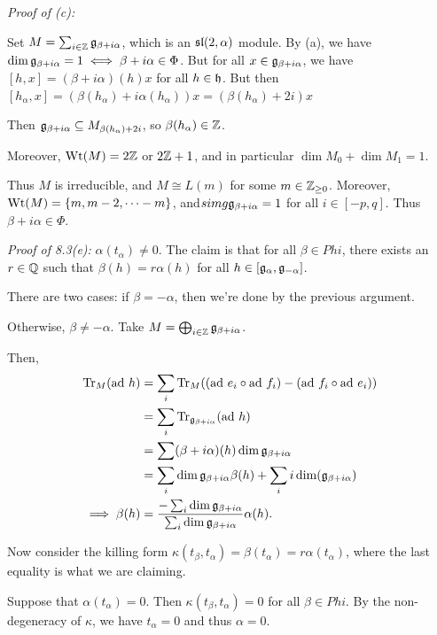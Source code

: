 \emph{Proof of (c):}

Set \(M = \sum_{i\in {\mathbb{Z}}} {\mathfrak{g}}_{\beta + i\alpha}\), which is an
\({\mathfrak{sl}}(2, \alpha)\) module. By (a), we have
\(\dim {\mathfrak{g}}_{\beta + i\alpha} = 1 \iff \beta + i\alpha \in \Phi\). But
for all \(x\in {\mathfrak{g}}_{\beta + i\alpha}\), we have
\([h, x] = (\beta + i\alpha)(h)x\) for all \(h\in{\mathfrak{h}}\). But then
\([h_\alpha, x] = (\beta(h_\alpha) + i \alpha(h_\alpha))x = (\beta(h_\alpha) + 2i)x\)

Then \({\mathfrak{g}}_{\beta + i\alpha} \subseteq M_{\beta(h_\alpha) + 2i}\), so
\(\beta(h_\alpha) \in {\mathbb{Z}}\).

Moreover, \(\mathrm{Wt}(M) = 2{\mathbb{Z}}\) or \(2{\mathbb{Z}} + 1\), and in particular
\(\dim M_0 + \dim M_1 = 1\).

Thus \(M\) is irreducible, and \(M \cong L(m)\) for some
\(m \in {\mathbb{Z}}_{\geq 0}\). Moreover,
\(\mathrm{Wt}(M) = \left\{{m, m-2, \cdots -m}\right\}\),
and\(simg {\mathfrak{g}}_{\beta + i\alpha} = 1\) for all \(i \in [-p, q]\). Thus
\(\beta + i\alpha \in \Phi\).

\emph{Proof of 8.3(e):} \(\alpha(t_\alpha) \neq 0\). The claim is that
for all \(\beta \in Phi\), there exists an \(r\in {\mathbb{Q}}\) such that
\(\beta(h) = r\alpha(h)\) for all
\(h \in [{\mathfrak{g}}_\alpha, {\mathfrak{g}}_{-\alpha}]\).

There are two cases: if \(\beta = -\alpha\), then we're done by the
previous argument.

Otherwise, \(\beta \neq -\alpha\). Take
\(M = \bigoplus_{i \in{\mathbb{Z}}} {\mathfrak{g}}_{\beta + i\alpha}\).

Then, \begin{align*}
\mathrm{Tr}_M(\mathrm{ad}~ h) 
&= \sum_i \mathrm{Tr}_M( (\mathrm{ad}~ e_i \circ \mathrm{ad}~ f_i) -(\mathrm{ad}~ f_i \circ \mathrm{ad}~ e_i) ) \\
&= \sum_i \mathrm{Tr}_{{\mathfrak{g}}_{\beta + i\alpha}}(\mathrm{ad}~ h) \\
&= \sum (\beta + i\alpha)(h) \dim {\mathfrak{g}}_{\beta + i\alpha} \\
&= \sum_i \dim {\mathfrak{g}}_{\beta + i\alpha} \beta(h) + \sum_i i\dim({\mathfrak{g}}_{\beta + i\alpha}) \\
\implies \beta(h) &= 
\frac{
-\sum_i \dim {\mathfrak{g}}_{\beta + i\alpha}
}{
\sum_i \dim {\mathfrak{g}}_{\beta + i\alpha}
}\alpha(h)
.\end{align*}

Now consider the killing form
\(\kappa(t_\beta, t_\alpha) = \beta(t_\alpha) = r \alpha(t_\alpha)\),
where the last equality is what we are claiming.

Suppose that \(\alpha(t_\alpha) = 0\). Then
\(\kappa(t_\beta, t_\alpha) = 0\) for all \(\beta \in Phi\). By the
non-degeneracy of \(\kappa\), we have \(t_\alpha = 0\) and thus
\(\alpha = 0\).


